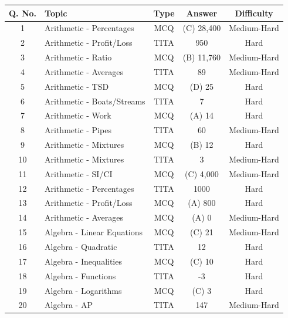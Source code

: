 \documentclass[11pt]{article}
\begin{document}
\begin{longtable}{|c|l|c|c|c|}
\hline
\textbf{Q. No.} & \textbf{Topic} & \textbf{Type} & \textbf{Answer} & \textbf{Difficulty} \\ \hline
1 & Arithmetic - Percentages         & MCQ  & (C) 28{,}400   & Medium-Hard \\ \hline
2 & Arithmetic - Profit/Loss         & TITA & 950            & Hard \\ \hline
3 & Arithmetic - Ratio               & MCQ  & (B) 11{,}760   & Medium-Hard \\ \hline
4 & Arithmetic - Averages            & TITA & 89             & Medium-Hard \\ \hline
5 & Arithmetic - TSD                 & MCQ  & (D) 25         & Hard \\ \hline
6 & Arithmetic - Boats/Streams       & TITA & 7              & Hard \\ \hline
7 & Arithmetic - Work                & MCQ  & (A) 14         & Hard \\ \hline
8 & Arithmetic - Pipes               & TITA & 60             & Medium-Hard \\ \hline
9 & Arithmetic - Mixtures            & MCQ  & (B) 12         & Hard \\ \hline
10 & Arithmetic - Mixtures           & TITA & 3              & Medium-Hard \\ \hline
11 & Arithmetic - SI/CI              & MCQ  & (C) 4{,}000    & Medium-Hard \\ \hline
12 & Arithmetic - Percentages        & TITA & 1000           & Hard \\ \hline
13 & Arithmetic - Profit/Loss        & MCQ  & (A) 800        & Hard \\ \hline
14 & Arithmetic - Averages           & MCQ  & (A) 0          & Medium-Hard \\ \hline
15 & Algebra - Linear Equations      & MCQ  & (C) 21         & Medium-Hard \\ \hline
16 & Algebra - Quadratic             & TITA & 12             & Hard \\ \hline
17 & Algebra - Inequalities          & MCQ  & (C) 10         & Hard \\ \hline
18 & Algebra - Functions             & TITA & -3             & Hard \\ \hline
19 & Algebra - Logarithms            & MCQ  & (C) 3          & Hard \\ \hline
20 & Algebra - AP                    & TITA & 147            & Medium-Hard \\ \hline

\end{longtable}
\end{document}
